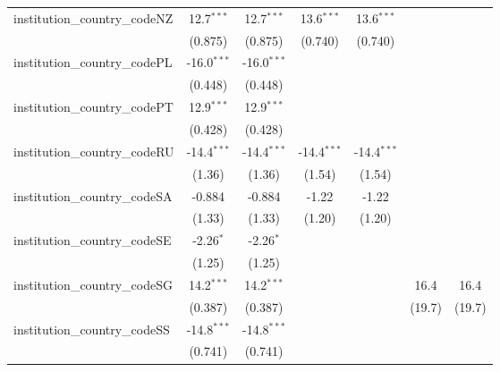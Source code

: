 \begin{tabular}{lcccccc}
   institution\_country\_codeNZ          & 12.7$^{***}$  & 12.7$^{***}$  & 13.6$^{***}$  & 13.6$^{***}$  &               &   \\   
                                         & (0.875)       & (0.875)       & (0.740)       & (0.740)       &               &   \\   
   institution\_country\_codePL          & -16.0$^{***}$ & -16.0$^{***}$ &               &               &               &   \\   
                                         & (0.448)       & (0.448)       &               &               &               &   \\   
   institution\_country\_codePT          & 12.9$^{***}$  & 12.9$^{***}$  &               &               &               &   \\   
                                         & (0.428)       & (0.428)       &               &               &               &   \\   
   institution\_country\_codeRU          & -14.4$^{***}$ & -14.4$^{***}$ & -14.4$^{***}$ & -14.4$^{***}$ &               &   \\   
                                         & (1.36)        & (1.36)        & (1.54)        & (1.54)        &               &   \\   
   institution\_country\_codeSA          & -0.884        & -0.884        & -1.22         & -1.22         &               &   \\   
                                         & (1.33)        & (1.33)        & (1.20)        & (1.20)        &               &   \\   
   institution\_country\_codeSE          & -2.26$^{*}$   & -2.26$^{*}$   &               &               &               &   \\   
                                         & (1.25)        & (1.25)        &               &               &               &   \\   
   institution\_country\_codeSG          & 14.2$^{***}$  & 14.2$^{***}$  &               &               & 16.4          & 16.4\\   
                                         & (0.387)       & (0.387)       &               &               & (19.7)        & (19.7)\\   
   institution\_country\_codeSS          & -14.8$^{***}$ & -14.8$^{***}$ &               &               &               &   \\   
                                         & (0.741)       & (0.741)       &               &               &               &   \\   

\end{tabular}
